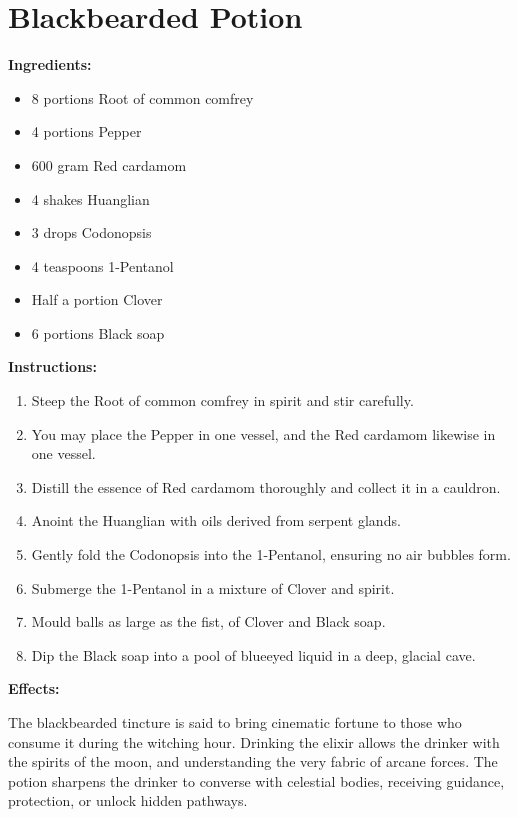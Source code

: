 \documentclass{article}
\begin{document}
\newpage
\section*{Blackbearded Potion}

\textbf{Ingredients:}

\begin{itemize}
  \item 8 portions Root of common comfrey
  \item 4 portions Pepper
  \item 600 gram Red cardamom
  \item 4 shakes Huanglian
  \item 3 drops Codonopsis
  \item 4 teaspoons 1-Pentanol
  \item Half a portion Clover
  \item 6 portions Black soap
\end{itemize}

\textbf{Instructions:}

\begin{enumerate}
  \item Steep the Root of common comfrey in spirit and stir carefully.
  \item You may place the Pepper in one vessel, and the Red cardamom likewise in one vessel.
  \item Distill the essence of Red cardamom thoroughly and collect it in a cauldron.
  \item Anoint the Huanglian with oils derived from serpent glands.
  \item Gently fold the Codonopsis into the 1-Pentanol, ensuring no air bubbles form.
  \item Submerge the 1-Pentanol in a mixture of Clover and spirit.
  \item Mould balls as large as the fist, of Clover and Black soap.
  \item Dip the Black soap into a pool of blueeyed liquid in a deep, glacial cave.
\end{enumerate}

\textbf{Effects:}

The blackbearded tincture is said to bring cinematic fortune to those who consume it during the witching hour. Drinking the elixir allows the drinker with the spirits of the moon, and understanding the very fabric of arcane forces. The potion sharpens the drinker to converse with celestial bodies, receiving guidance, protection, or unlock hidden pathways.
\end{document}
